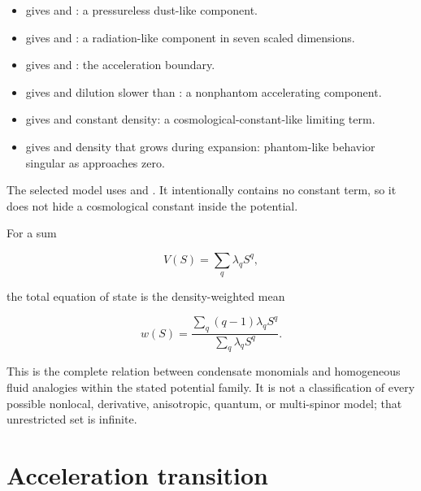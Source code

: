 \documentclass[11pt]{article}
\begin{document}
\begin{itemize}
\item \texttt{} gives \texttt{} and \texttt{}: a pressureless
dust-like component.

\item \texttt{} gives \texttt{} and \texttt{}: a radiation-like
component in seven scaled dimensions.

\item \texttt{} gives \texttt{} and \texttt{}: the acceleration
boundary.

\item \texttt{} gives \texttt{} and dilution slower than \texttt{}: a
nonphantom accelerating component.

\item \texttt{} gives \texttt{} and constant density: a cosmological-constant-like
limiting term.

\item \texttt{} gives \texttt{} and density that grows during expansion: phantom-like
behavior singular as \texttt{} approaches zero.

\end{itemize}

The selected model uses \texttt{} and \texttt{}. It intentionally contains no \texttt{} constant term, so it does not hide a cosmological constant inside the potential.

For a sum

\[
V(S)=\sum_q\lambda_qS^q,
\]

the total equation of state is the density-weighted mean

\[
w(S)=\frac{\sum_q(q-1)\lambda_qS^q}
{\sum_q\lambda_qS^q}.
\]

This is the complete relation between condensate monomials and homogeneous fluid analogies within the stated potential family. It is not a classification of every possible nonlocal, derivative, anisotropic, quantum, or multi-spinor model; that unrestricted set is infinite.

\section{Acceleration transition}
\end{document}

